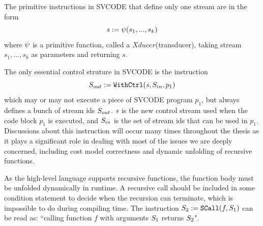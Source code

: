 The primitive instructions in SVCODE that define only one stream are in the form
$$\sdef{\s}{\psi(s_1,...,s_k)} $$  
where $\lcall$ is a primitive function, called a $Xducer$(transducer), taking stream $s_1,...,s_k$ as parameters and returning $s$. 

The only essential control struture in SVCODE is the \wc instruction 
$$\withctrl{\s}{p_1}{\Sin}{\Sout} $$
which may or may not execute a piece of SVCODE program $p_1$, but always defines a bunch of stream ids $\Sout$.
$\s$ is the new control stream used when the code block $p_1$ is executed, and $\Sin$ is the set of stream ids that can be used in $p_1$. 
Discussions about this
instruction will occur many times throughout the thesis as it plays a significant role in dealing with most of the issues we are deeply concerned, 
including cost model correctness and dynamic unfolding of recursive functions. 





As the high-level language supports recursive functions, the function body must be unfolded dynamically in runtime. 
A recursive call should be included in some condition statement to decide when the recursion can terminate, which is impossible to do during compiling time. 
The instruction $\scall{f}{\S_1}{\S_2}$ can be read as: ``calling function $f$ with arguments $\S_1$ returns $\S_2$".

